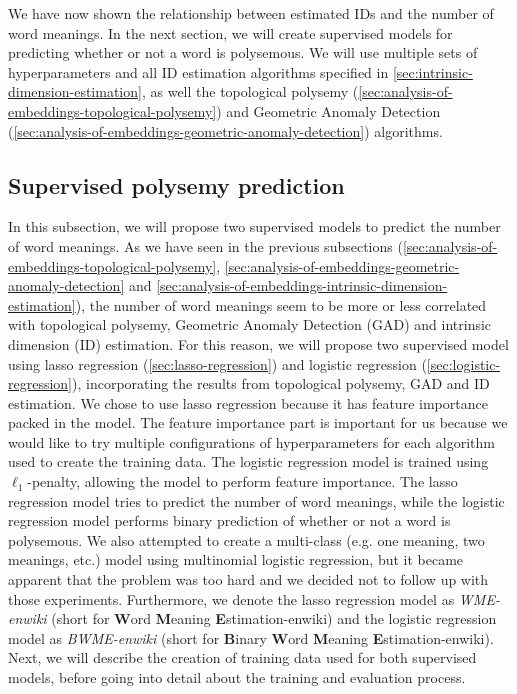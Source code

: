 We have now shown the relationship between estimated IDs and the number of word meanings. In the next section, we will create supervised models for predicting whether or not a word is polysemous. We will use multiple sets of hyperparameters and all ID estimation algorithms specified in \cref{sec:intrinsic-dimension-estimation}, as well the topological polysemy (\cref{sec:analysis-of-embeddings-topological-polysemy}) and Geometric Anomaly Detection (\cref{sec:analysis-of-embeddings-geometric-anomaly-detection}) algorithms.

\subsection{Supervised polysemy prediction}
\label{sec:analysis-of-embeddings-supervised-polysemy-prediction}
In this subsection, we will propose two supervised models to predict the number of word meanings. As we have seen in the previous subsections (\cref{sec:analysis-of-embeddings-topological-polysemy}, \cref{sec:analysis-of-embeddings-geometric-anomaly-detection} and \cref{sec:analysis-of-embeddings-intrinsic-dimension-estimation}), the number of word meanings seem to be more or less correlated with topological polysemy, Geometric Anomaly Detection (GAD) and intrinsic dimension (ID) estimation. For this reason, we will propose two supervised model using lasso regression (\cref{sec:lasso-regression}) and logistic regression (\cref{sec:logistic-regression}), incorporating the results from topological polysemy, GAD and ID estimation. We chose to use lasso regression because it has feature importance packed in the model. The feature importance part is important for us because we would like to try multiple configurations of hyperparameters for each algorithm used to create the training data. The logistic regression model is trained using $\ell_1$-penalty, allowing the model to perform feature importance. The lasso regression model tries to predict the number of word meanings, while the logistic regression model performs binary prediction of whether or not a word is polysemous. We also attempted to create a multi-class (e.g. one meaning, two meanings, etc.) model using multinomial logistic regression, but it became apparent that the problem was too hard and we decided not to follow up with those experiments. Furthermore, we denote the lasso regression model as \textit{WME-enwiki} (short for \textbf{W}ord \textbf{M}eaning \textbf{E}stimation-enwiki) and the logistic regression model as \textit{BWME-enwiki} (short for \textbf{B}inary \textbf{W}ord \textbf{M}eaning \textbf{E}stimation-enwiki). Next, we will describe the creation of training data used for both supervised models, before going into detail about the training and evaluation process.

